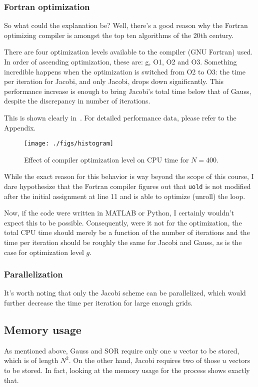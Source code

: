 \documentclass{SelimArticle}
\begin{document}
\subsubsection{Fortran optimization}
So what could the explanation be? Well, there's a good reason why the Fortran optimizing compiler
is amongst the top ten algorithms of the 20th century.

There are four optimization levels available to the compiler (GNU Fortran) used.
In order of ascending optimization, these are: g, O1, O2 and O3.
Something incredible happens when the optimization is switched from O2 to O3: the time
per iteration for Jacobi, and only Jacobi, drops down significantly. This performance increase is
enough to bring Jacobi's total time below that of Gauss, despite the discrepancy in number of
iterations.

This is shown clearly in~. For detailed performance data, please refer to the
Appendix.
\begin{figure}
    \centering
    \texttt{[image: ./figs/histogram]}
    \caption{Effect of compiler optimization level on CPU time for $N=400$.}\label{fig:histogram}
\end{figure}

While the exact reason for this behavior is way beyond the scope of this course, I dare hypothesize
that the Fortran compiler figures out that \texttt{uold} is not modified after the initial
assignment at line 11 and is able to optimize (unroll) the loop.

Now, if the code were written in MATLAB or Python, I certainly wouldn't expect this to be possible.
Consequently, were it not for the optimization, the total CPU time should merely be a function of
the number of iterations and the time per iteration should be roughly the same for Jacobi and Gauss,
as is the case for optimization level $g$.

\subsubsection{Parallelization}
It's worth noting that only the Jacobi scheme can be parallelized, which would further decrease
the time per iteration for large enough grids.

\subsection{Memory usage}
As mentioned above, Gauss and SOR require only one $u$ vector to be stored, which is of length $N^2$. On
the other hand, Jacobi requires two of those $u$ vectors to be stored. In fact, looking at the memory usage
for the process shows exactly that.
\end{document}
